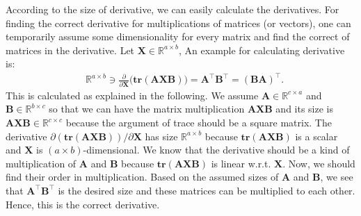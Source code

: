 \documentclass[lang=cn,10pt]{gorgeousnbook}
\numberwithin{equation}{section}%
\numberwithin{figure}{section}%
\begin{document}
\begin{corollary}
According to the size of derivative, we can easily calculate the derivatives. For finding the correct derivative for multiplications of matrices (or vectors), one can temporarily assume some dimensionality for every matrix and find the correct of matrices in the derivative. 
Let $\boldsymbol{X} \in \mathbb{R}^{a \times b}$,
An example for calculating derivative is:
\begin{align}\label{equation_derivative_trace_wrt_matrix}
& \mathbb{R}^{a \times b} \ni \frac{\partial}{\partial \boldsymbol{X}} \big(\textbf{tr}(\boldsymbol{A}\boldsymbol{X}\boldsymbol{B})\big) = \boldsymbol{A}^\top \boldsymbol{B}^\top = (\boldsymbol{BA})^\top.
\end{align}
This is calculated as explained in the following. We assume $\boldsymbol{A} \in \mathbb{R}^{c \times a}$ and $\boldsymbol{B} \in \mathbb{R}^{b \times c}$ so that we can have the matrix multiplication $\boldsymbol{A}\boldsymbol{X}\boldsymbol{B}$ and its size is $\boldsymbol{A}\boldsymbol{X}\boldsymbol{B} \in \mathbb{R}^{c \times c}$ because the argument of trace should be a square matrix. 
The derivative $\partial (\textbf{tr}(\boldsymbol{A}\boldsymbol{X}\boldsymbol{B})) / \partial \boldsymbol{X}$ has size $\mathbb{R}^{a \times b}$ because $\textbf{tr}(\boldsymbol{A}\boldsymbol{X}\boldsymbol{B})$ is a scalar and $\boldsymbol{X}$ is $(a \times b)$-dimensional. 
We know that the derivative should be a kind of multiplication of $\boldsymbol{A}$ and $\boldsymbol{B}$ because $\textbf{tr}(\boldsymbol{A}\boldsymbol{X}\boldsymbol{B})$ is linear w.r.t. $\boldsymbol{X}$. Now, we should find their order in multiplication. 
Based on the assumed sizes of $\boldsymbol{A}$ and $\boldsymbol{B}$, we see that $\boldsymbol{A}^\top \boldsymbol{B}^\top$ is the desired size and these matrices can be multiplied to each other. Hence, this is the correct derivative. 
\end{corollary}
\end{document}
